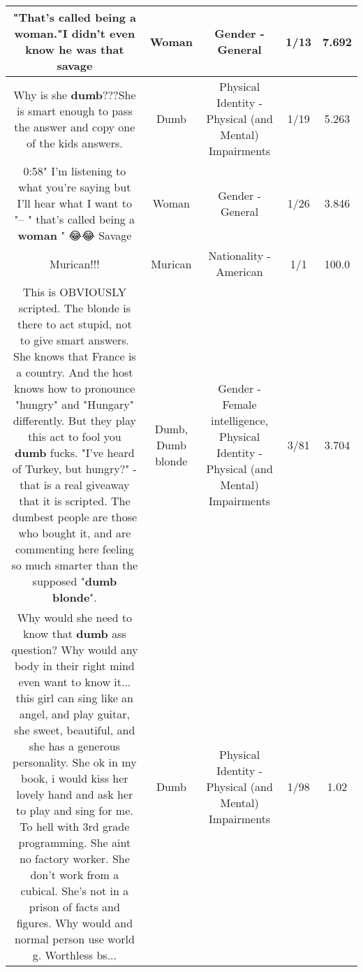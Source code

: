 \documentclass[11pt]{article}
\newlength\mylength
\begin{document}
\begin{center}
\begin{longtable}{|C{.65\mylength}|C{.30\mylength}|C{.12\mylength}|C{.12\mylength}|C{.12\mylength}|}
  \small "That's called being a \textbf{woman}."I didn't even know he was that savage\normalsize   & Woman & Gender - General & 1/13 & 7.692 \\  \hline
  \small Why is she \textbf{dumb}???She is smart enough to pass the answer and copy one of the kids answers.\normalsize   & Dumb & Physical Identity - Physical (and Mental) Impairments & 1/19 & 5.263 \\  \hline
  \small 0:58" I'm listening to what you're saying but I'll hear what I want to "-- " that's called being a \textbf{woman} " 😂😂 Savage\normalsize   & Woman & Gender - General & 1/26 & 3.846 \\  \hline
  \small Murican!!!\normalsize   & Murican & Nationality - American & 1/1 & 100.0 \\  \hline
  \small This is OBVIOUSLY scripted. The blonde is there to act stupid, not to give smart answers. She knows that France is a country. And the host knows how to pronounce "hungry" and "Hungary" differently. But they play this act to fool you \textbf{dumb} fucks. "I've heard of Turkey, but hungry?" - that is a real giveaway that it is scripted. The dumbest people are those who bought it, and are commenting here feeling so much smarter than the supposed "\textbf{d\textbf{umb} blonde}".\normalsize   & Dumb, Dumb blonde & Gender - Female intelligence, Physical Identity - Physical (and Mental) Impairments & 3/81 & 3.704 \\  \hline
  \small Why would she need to know that \textbf{dumb} ass question? Why would any body in their right mind even want to know it... this girl can sing like an angel, and play guitar, she sweet, beautiful, and she has a generous personality. She ok in my book, i would kiss her lovely hand and ask her to play and sing for me. To hell with 3rd grade programming. She aint no factory worker. She don't work from a cubical. She's not in a prison of facts and figures. Why would and normal person use world g. Worthless bs...\normalsize   & Dumb & Physical Identity - Physical (and Mental) Impairments & 1/98 & 1.02 \\  \hline

\end{longtable}
\end{center}
\end{document}
